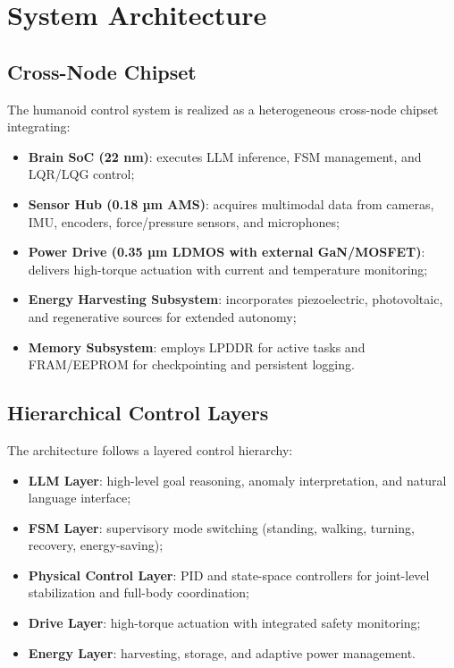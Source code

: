\section{System Architecture}

\subsection{Cross-Node Chipset}
The humanoid control system is realized as a heterogeneous cross-node chipset integrating:
\begin{itemize}
  \item \textbf{Brain SoC (22 nm)}: executes LLM inference, FSM management, and LQR/LQG control;
  \item \textbf{Sensor Hub (0.18 µm AMS)}: acquires multimodal data from cameras, IMU, encoders, force/pressure sensors, and microphones;
  \item \textbf{Power Drive (0.35 µm LDMOS with external GaN/MOSFET)}: delivers high-torque actuation with current and temperature monitoring;
  \item \textbf{Energy Harvesting Subsystem}: incorporates piezoelectric, photovoltaic, and regenerative sources for extended autonomy;
  \item \textbf{Memory Subsystem}: employs LPDDR for active tasks and FRAM/EEPROM for checkpointing and persistent logging.
\end{itemize}

\subsection{Hierarchical Control Layers}
The architecture follows a layered control hierarchy:
\begin{itemize}
  \item \textbf{LLM Layer}: high-level goal reasoning, anomaly interpretation, and natural language interface;
  \item \textbf{FSM Layer}: supervisory mode switching (standing, walking, turning, recovery, energy-saving);
  \item \textbf{Physical Control Layer}: PID and state-space controllers for joint-level stabilization and full-body coordination;
  \item \textbf{Drive Layer}: high-torque actuation with integrated safety monitoring;
  \item \textbf{Energy Layer}: harvesting, storage, and adaptive power management.
\end{itemize}

